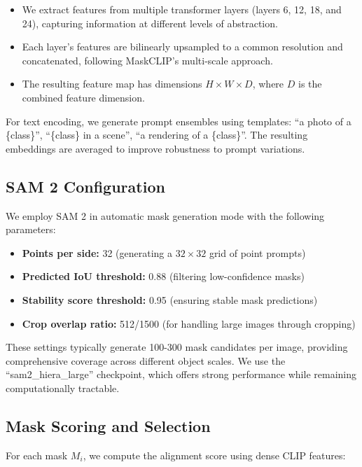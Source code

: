 \begin{itemize}
    \item We extract features from multiple transformer layers (layers 6, 12, 18, and 24), capturing information at different levels of abstraction.
    \item Each layer's features are bilinearly upsampled to a common resolution and concatenated, following MaskCLIP's multi-scale approach.
    \item The resulting feature map has dimensions $H \times W \times D$, where $D$ is the combined feature dimension.
\end{itemize}

For text encoding, we generate prompt ensembles using templates: ``a photo of a \{class\}'', ``\{class\} in a scene'', ``a rendering of a \{class\}''. The resulting embeddings are averaged to improve robustness to prompt variations.

\subsection{SAM 2 Configuration}

We employ SAM 2 in automatic mask generation mode with the following parameters:

\begin{itemize}
    \item \textbf{Points per side:} 32 (generating a $32 \times 32$ grid of point prompts)
    \item \textbf{Predicted IoU threshold:} 0.88 (filtering low-confidence masks)
    \item \textbf{Stability score threshold:} 0.95 (ensuring stable mask predictions)
    \item \textbf{Crop overlap ratio:} 512/1500 (for handling large images through cropping)
\end{itemize}

These settings typically generate 100-300 mask candidates per image, providing comprehensive coverage across different object scales. We use the ``sam2\_hiera\_large'' checkpoint, which offers strong performance while remaining computationally tractable.

\subsection{Mask Scoring and Selection}

For each mask $M_i$, we compute the alignment score using dense CLIP features:

